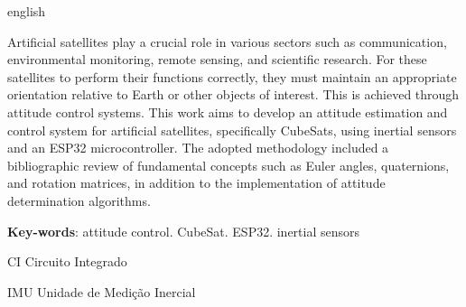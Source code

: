 \documentclass[
	12pt,				%
	openright,			%
	oneside,			%
	a4paper,			%
	english,			%
	brazil				%
	]{abntex2}
\begin{document}
\begin{resumo}[Abstract]
 \begin{otherlanguage*}{english}

\noindent Artificial satellites play a crucial role in various sectors such as communication, environmental monitoring, remote sensing, and scientific research. For these satellites to perform their functions correctly, they must maintain an appropriate orientation relative to Earth or other objects of interest. This is achieved through attitude control systems. This work aims to develop an attitude estimation and control system for artificial satellites, specifically CubeSats, using inertial sensors and an ESP32 microcontroller. The adopted methodology included a bibliographic review of fundamental concepts such as Euler angles, quaternions, and rotation matrices, in addition to the implementation of attitude determination algorithms.

   \vspace{\onelineskip}

   \noindent
   \textbf{Key-words}: attitude control. CubeSat. ESP32. inertial sensors
 \end{otherlanguage*}
\end{resumo}


\listoffigures*
\cleardoublepage

\listoftables*
\cleardoublepage


\begin{siglas}
  \item[CI] Circuito Integrado 
  \item[IMU] Unidade de Medição Inercial
\end{siglas}

  

\tableofcontents*
\cleardoublepage


\makeatletter
{}
\makeatother



\end{document}
